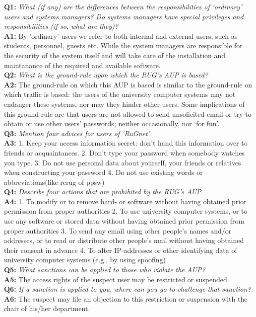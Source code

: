\documentclass[a4paper]{article}
\begin{document}
\textbf{Q1:} \textit{What (if any) are the differences between the responsibilities of `ordinary' users and systems managers? Do systems managers have special privileges and responsibilities (if so, what are they)?}\\
\textbf{A1:} By 'ordinary' users we refer to both internal and external users, such as students, personnel, guests etc. While the system managers are responsible for the security of the system itself and will take care of the installation and maintanance of the required and available software.\\
\textbf{Q2:} \textit{What is the ground-rule upon which the RUG's AUP is based?}\\
\textbf{A2:} The ground-rule on which this AUP is based is similar to the ground-rule on which traffic is based: the users of the university computer systems may not endanger these systems, nor may they hinder other users. Some implications of this ground-rule are that users are not allowed to send unsolicited email or try to obtain or use other users' passwords; neither occasionally, nor `for fun'.\\
\textbf{Q3:} \textit{Mention four advices for users of `RuGnet'.}\\
\textbf{A3:} 1. Keep your access information secret: don't hand this information over to friends or acquaintances. 2. Don't type your password when somebody watches you type.
 3. Do not use personal data about yourself, your friends or relatives when constructing your password
 4. Do not use existing words or abbreviations(like rcrug of ppsw)\\
\textbf{Q4:} \textit{Describe four actions that are prohibited by the RUG's AUP}\\
\textbf{A4:} 1. To modify or to remove hard- or software without having obtained prior permission from proper authorities
 2. To use university computer systems, or to use any software or stored data without having obtained prior permission from proper authorities
 3. To send any email using other people's names and/or addresses, or to read or distribute other people's mail without having obtained their consent in advance
 4. To alter IP-addresses or other identifying data of university computer systems (e.g., by using spoofing)\\
\textbf{Q5:} \textit{What sanctions can be applied to those who violate the AUP?}\\
\textbf{A5:} The access rights of the suspect user may be restricted or suspended.\\
\textbf{Q6:} \textit{If a sanction is applied to you, where can you go to challenge that sanction?}\\
\textbf{A6:} The suspect may file an objection to this restriction or suspension with the chair of his/her department. 
\end{document}
